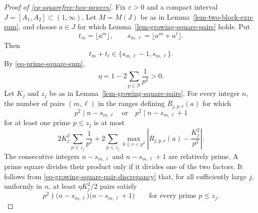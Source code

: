 \documentclass[11pt,reqno]{amsart}
\numberwithin{equation}{section}
\begin{document}
    \begin{proof}[Proof of \eqref{eq-squarefree-two-powers}]
        Fix $\varepsilon>0$ and a compact interval $J=[A_1,A_2]\subset(1,\infty)$. Let $M=M(J)$ be as in Lemma~\ref{lem-two-block-exp-sum}, and choose $a\in J$ for which Lemma~\ref{lem-growing-square-pairs} holds. Put
        $$
        t_m=\lfloor a^m\rfloor,
        \qquad
        s_{m,\ell}=\lfloor a^m+a^\ell\rfloor.
        $$
        Then
        \begin{equation}\label{eq-two-floor-alternatives}
            t_m+t_\ell\in\{s_{m,\ell}-1,s_{m,\ell}\}.
        \end{equation}
        By \eqref{eq-prime-square-sum},
        $$
        \eta=1-2\sum_{p\in\mathcal{P}}\frac1{p^2}>0.
        $$
        Let $K_j$ and $z_j$ be as in Lemma~\ref{lem-growing-square-pairs}. For every integer $n$, the number of pairs $(m,\ell)$ in the ranges defining $R_{j,p,r}(a)$ for which
        $$
        p^2\mid n-s_{m,\ell}
        \quad\text{or}\quad
        p^2\mid n-s_{m,\ell}+1
        $$
        for at least one prime $p\le z_j$ is at most
        $$
        2K_j^2\sum_{p\le z_j}\frac1{p^2}
        +2\sum_{p\le z_j}
        \max_{0\le r<p^2}
        \left|R_{j,p,r}(a)-\frac{K_j^2}{p^2}\right|.
        $$
        The consecutive integers $n-s_{m,\ell}$ and $n-s_{m,\ell}+1$ are relatively prime. A prime square divides their product only if it divides one of the two factors. It follows from \eqref{eq-growing-square-pair-discrepancy} that, for all sufficiently large $j$, uniformly in $n$, at least $\eta K_j^2/2$ pairs satisfy
        \begin{equation}\label{eq-two-no-small-squares}
            p^2\nmid
        \bigl(n-s_{m,\ell}\bigr)
        \bigl(n-s_{m,\ell}+1\bigr)
        \qquad
        \text{for every prime }p\le z_j.
        \end{equation}


\end{proof}
\end{document}
